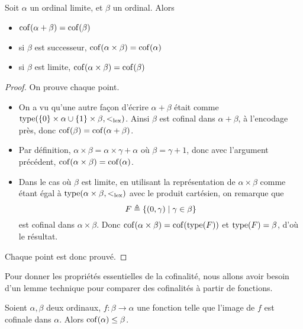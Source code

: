 \begin{proposition}\label{prop.cof.oper}
  Soit $\alpha$ un ordinal limite, et $\beta$ un ordinal. Alors
  \begin{itemize}
  \item $\operatorname{cof}(\alpha + \beta) = \operatorname{cof}(\beta)$
  \item si $\beta$ est successeur, $\operatorname{cof}(\alpha \times \beta) = \operatorname{cof}(\alpha)$
  \item si $\beta$ est limite, $\operatorname{cof}(\alpha\times\beta) = \operatorname{cof}(\beta)$
  \end{itemize}
\end{proposition}

\begin{proof}
  On prouve chaque point.
  \begin{itemize}
  \item On a vu qu'une autre façon d'écrire $\alpha + \beta$ était comme
    $\operatorname{type}(\{0\}\times\alpha \cup \{1\}\times\beta, <_{\mathrm{lex}})$. Ainsi $\beta$ est
    cofinal dans $\alpha + \beta$, à l'encodage près, donc
    $\operatorname{cof}(\beta) = \operatorname{cof}(\alpha + \beta)$.
  \item Par définition, $\alpha \times \beta = \alpha \times \gamma + \alpha$
    où $\beta = \gamma + 1$, donc avec l'argument précédent,
    $\operatorname{cof}(\alpha\times\beta) = \operatorname{cof}(\alpha)$.
  \item Dans le cas où $\beta$ est limite, en utilisant la représentation de
    $\alpha \times \beta$ comme étant égal à $\operatorname{type}(\alpha\times\beta,<_{\mathrm{lex}})$
    avec le produit cartésien, on remarque que
    \[F \triangleq \{(0,\gamma) \mid \gamma \in \beta\}\]
    est cofinal dans $\alpha \times \beta$. Donc
    $\operatorname{cof}(\alpha\times \beta) = \operatorname{cof}(\operatorname{type}(F))$ et $\operatorname{type}(F) = \beta$, d'où le
    résultat.
  \end{itemize}
  Chaque point est donc prouvé.
\end{proof}

Pour donner les propriétés essentielles de la cofinalité, nous allons avoir
besoin d'un lemme technique pour comparer des cofinalités à partir de fonctions.

\begin{proposition}\label{prop.cof.compar.surj}
  Soient $\alpha,\beta$ deux ordinaux, $f : \beta \to \alpha$ une fonction telle
  que l'image de $f$ est cofinale dans $\alpha$. Alors
  $\operatorname{cof}(\alpha) \leq \beta$.
\end{proposition}

